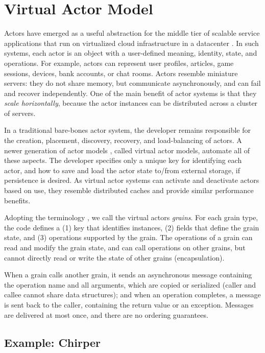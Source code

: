 \section{Virtual Actor Model}\label{sec:virtualactors}

Actors have emerged as a useful abstraction for the middle tier of scalable service applications that run on virtualized cloud infrastructure in a datacenter . In such systems, each actor is an object with a user-defined meaning, identity, state, and operations. For example, actors can represent user profiles, articles, game sessions, devices, bank accounts, or chat rooms. Actors resemble miniature servers: they do not share memory, but communicate asynchronously, and can fail and recover independently. One of the main benefit of actor systems is that they \emph{scale horizontally}, because the actor instances can be distributed across a cluster of servers.

In a traditional bare-bones actor system, the developer remains responsible for the creation, placement, discovery, recovery, and load-balancing of actors. A newer generation of actor models \cite{orleans,orbit,sfactors}, called virtual actor models, automate all of these aspects. The developer specifies only a unique key for identifying each actor, and how to save and load the actor state to/from external storage, if persistence is desired. As virtual actor systems can activate and deactivate actors based on use, they resemble distributed caches \cite{memcached} and provide similar performance benefits. 

Adopting the terminology \cite{orleanstr,orleans-socc}, we call the virtual actors \emph{grains}. For each grain type, the code defines a (1) key that identifies instances, (2)  fields that define the grain state, and (3) operations supported by the grain. The operations of a grain can read and modify the grain state, and can call operations on other grains, but cannot directly read or write the state of other grains (encapsulation). 

When a grain calls another grain, it sends an asynchronous message containing the operation name and all arguments, which are copied or serialized (caller and callee cannot share data structures); and when an operation completes, a message is sent back to the caller, containing the return value or an exception. Messages are delivered at most once, and there are no ordering guarantees.
 
\subsection{Example: Chirper}

